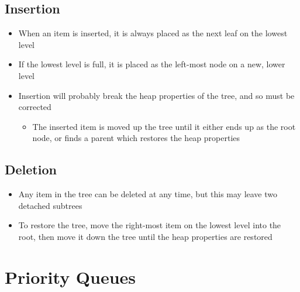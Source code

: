 \subsection*{Insertion}

\begin{itemize}
  \item When an item is inserted, it is always placed as the next leaf on the lowest level
  \item If the lowest level is full, it is placed as the left-most node on a new, lower level
  \item Insertion will probably break the heap properties of the tree, and so must be corrected
  \begin{itemize}
    \item The inserted item is moved up the tree until it either ends up as the root node, or finds a parent which restores the heap properties
  \end{itemize}
\end{itemize}

\subsection*{Deletion}

\begin{itemize}
  \item Any item in the tree can be deleted at any time, but this may leave two detached subtrees
  \item To restore the tree, move the right-most item on the lowest level into the root, then move it down the tree until the heap properties are restored
\end{itemize}

\section*{Priority Queues}

